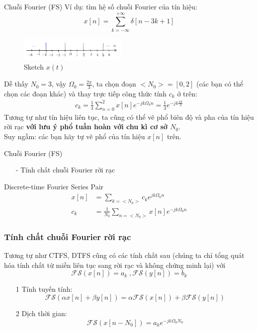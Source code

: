 \documentclass[8pt]{beamer}
\begin{document}
\begin{frame}{Chuỗi Fourier (FS)}
Ví dụ: tìm hệ số chuỗi Fourier của tín hiệu: $$x[n]=\sum_{k=-\infty}^{+\infty}\delta[n-3k+1]$$
\begin{figure}[h]
			\includegraphics[width=0.46\textwidth]{d.jpg}
			\caption{Sketch $x(t)$}\label{fig:re11}

		\end{figure}
Dễ thấy $N_{0}=3$, vậy $\Omega_{0}=\frac{2\pi}{3}$, ta chọn đoạn $<N_{0}>=[0,2]$ (các bạn có thể chọn các đoạn khác) và thay trực tiếp công thức tính $c_{k}$ ở trên:
\begin{equation*}
\begin{split}
	c_{k}=\frac{1}{3}\sum_{n=0}^2 x[n]e^{-jk\Omega_{0}n}=\frac{1}{3}e^{-jk\frac{4\pi}{3}}
\end{split}
\end{equation*}
Tương tự như tín hiệu liên tục, ta cũng có thể vẽ phổ biên độ và pha của tín hiệu rời rạc \textbf{với lưu ý phổ tuần hoàn với chu kì cơ sở $N_{0}$}.
\\ Suy ngẫm: các bạn hãy tự vẽ phổ của tín hiệu $x[n]$ trên.
\end{frame}
\begin{frame}{Chuỗi Fourier (FS)}
\begin{itemize}
	\item[-] Tính chất chuỗi Fourier rời rạc
\end{itemize}
\begin{block}{Discrete-time Fourier Series Pair}
	\begin{equation*}
		\begin{split}
			x[n]&=\sum_{k=<N_{0}>}c_{k}e^{jk\Omega_{0}n}\\
			c_{k}&=\frac{1}{N_{0}}\sum_{n=<N_{0}>}x[n]e^{-jk\Omega_{0}n}
\end{split}
\end{equation*}
\end{block}
\subsubsection{Tính chất chuỗi Fourier rời rạc}
Tương tự như CTFS, DTFS cũng có các tính chất sau (chúng ta chỉ tổng quát hóa tính chất từ miền liên tục sang rời rạc và không chứng minh lại)
với $$\mathscr{FS}(x[n])=a_{k}\; , \mathscr{FS}(y[n])=b_{k}$$
\begin{enumerate}
	\item[1] Tính tuyến tính: $$\mathscr{FS}(\alpha x[n]+\beta y[n])=\alpha\mathscr{FS}(x[n])+\beta\mathscr{FS}(y[n])$$
	\item[2] Dịch thời gian: $$\mathscr{FS}(x[n-N_{0}])=a_{k}e^{-jk\Omega_{0}N_{0}}$$
\end{enumerate}
\end{frame}
\end{document}

